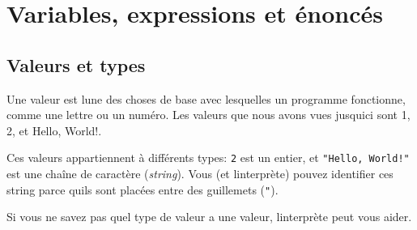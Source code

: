 \hypertarget{variables-expressions-et-uxe9noncuxe9s}{%
\section{Variables, expressions et
énoncés}\label{variables-expressions-et-uxe9noncuxe9s}}

\hypertarget{valeurs-et-types}{%
\subsection{Valeurs et types}\label{valeurs-et-types}}

Une valeur est l\textquotesingle une des choses de base avec lesquelles
un programme fonctionne, comme une lettre ou un numéro. Les valeurs que
nous avons vues jusqu\textquotesingle ici sont 1, 2, et
\textquotesingle Hello, World!\textquotesingle.

Ces valeurs appartiennent à différents types: \texttt{2} est un entier,
et \texttt{"Hello,\ World!"} est une chaîne de caractère
(\emph{string}). Vous (et l\textquotesingle interprète) pouvez
identifier ces string parce qu\textquotesingle ils sont placées entre
des guillemets (\texttt{"}).

Si vous ne savez pas quel type de valeur a une valeur,
l\textquotesingle interprète peut vous aider.

\begin{Shaded}
\begin{Highlighting}[]
\OperatorTok{\textgreater{}\textgreater{}\textgreater{}} \NormalTok{(}\NormalTok{)}
\OperatorTok{\textless{}} \OperatorTok{\textgreater{}}
\OperatorTok{\textgreater{}\textgreater{}\textgreater{}} \NormalTok{(}\NormalTok{)}
\OperatorTok{\textless{}} \OperatorTok{\textgreater{}}
\OperatorTok{\textgreater{}\textgreater{}\textgreater{}} \NormalTok{(}\NormalTok{)}
\OperatorTok{\textless{}} \OperatorTok{\textgreater{}}
\OperatorTok{\textgreater{}\textgreater{}\textgreater{}} \NormalTok{(}\StringTok{\textquotesingle{}17\textquotesingle{}}\NormalTok{)}
\OperatorTok{\textless{}} \OperatorTok{\textgreater{}}
\OperatorTok{\textgreater{}\textgreater{}\textgreater{}} \NormalTok{(}\StringTok{\textquotesingle{}3.2\textquotesingle{}}\NormalTok{)}
\OperatorTok{\textless{}} \OperatorTok{\textgreater{}}
\end{Highlighting}
\end{Shaded}

